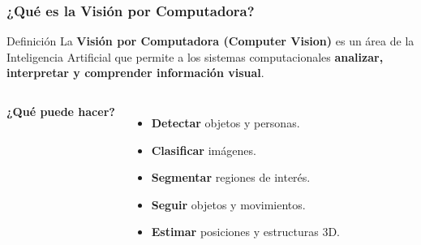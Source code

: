 \documentclass[aspectratio=169]{beamer}
\begin{document}
\begin{frame}
\frametitle{¿Qué es la Visión por Computadora?}

\begin{block}{Definición}
La \textbf{Visión por Computadora (Computer Vision)} es un área de la
Inteligencia Artificial que permite a los sistemas computacionales
\textbf{analizar, interpretar y comprender información visual}.
\end{block}

\vspace{0.15cm}

\begin{columns}[T]


\textbf{¿Qué puede hacer?}

\begin{itemize}
    \item \textbf{Detectar} objetos y personas.
    \item \textbf{Clasificar} imágenes.
    \item \textbf{Segmentar} regiones de interés.
    \item \textbf{Seguir} objetos y movimientos.
    \item \textbf{Estimar} posiciones y estructuras 3D.
\end{itemize}






\begin{center}

\end{center}
\end{columns}
\end{frame}
\end{document}
